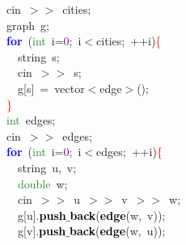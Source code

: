 {{\mbox{}\ \ \ \ cin\ \textcolor{BrickRed}{$>$$>$}\ cities\textcolor{BrickRed}{;} \\
\mbox{}\ \ \ \ graph\ g\textcolor{BrickRed}{;} \\
\mbox{}\ \ \ \ \textbf{\textcolor{Blue}{for}}\ \textcolor{BrickRed}{(}\textcolor{ForestGreen}{int}\ i\textcolor{BrickRed}{=}\textcolor{Purple}{0}\textcolor{BrickRed}{;}\ i\textcolor{BrickRed}{$<$}cities\textcolor{BrickRed}{;}\ \textcolor{BrickRed}{++}i\textcolor{BrickRed}{)}\textcolor{Red}{\{} \\
\mbox{}\ \ \ \ \ \ string\ s\textcolor{BrickRed}{;} \\
\mbox{}\ \ \ \ \ \ cin\ \textcolor{BrickRed}{$>$$>$}\ s\textcolor{BrickRed}{;} \\
\mbox{}\ \ \ \ \ \ g\textcolor{BrickRed}{[}s\textcolor{BrickRed}{]}\ \textcolor{BrickRed}{=}\ vector\textcolor{BrickRed}{$<$}edge\textcolor{BrickRed}{$>$();} \\
\mbox{}\ \ \ \ \textcolor{Red}{\}} \\
\mbox{}\ \ \ \ \textcolor{ForestGreen}{int}\ edges\textcolor{BrickRed}{;} \\
\mbox{}\ \ \ \ cin\ \textcolor{BrickRed}{$>$$>$}\ edges\textcolor{BrickRed}{;} \\
\mbox{}\ \ \ \ \textbf{\textcolor{Blue}{for}}\ \textcolor{BrickRed}{(}\textcolor{ForestGreen}{int}\ i\textcolor{BrickRed}{=}\textcolor{Purple}{0}\textcolor{BrickRed}{;}\ i\textcolor{BrickRed}{$<$}edges\textcolor{BrickRed}{;}\ \textcolor{BrickRed}{++}i\textcolor{BrickRed}{)}\textcolor{Red}{\{} \\
\mbox{}\ \ \ \ \ \ string\ u\textcolor{BrickRed}{,}\ v\textcolor{BrickRed}{;} \\
\mbox{}\ \ \ \ \ \ \textcolor{ForestGreen}{double}\ w\textcolor{BrickRed}{;} \\
\mbox{}\ \ \ \ \ \ cin\ \textcolor{BrickRed}{$>$$>$}\ u\ \textcolor{BrickRed}{$>$$>$}\ v\ \textcolor{BrickRed}{$>$$>$}\ w\textcolor{BrickRed}{;} \\
\mbox{}\ \ \ \ \ \ g\textcolor{BrickRed}{[}u\textcolor{BrickRed}{].}\textbf{\textcolor{Black}{push$\_$back}}\textcolor{BrickRed}{(}\textbf{\textcolor{Black}{edge}}\textcolor{BrickRed}{(}w\textcolor{BrickRed}{,}\ v\textcolor{BrickRed}{));} \\
\mbox{}\ \ \ \ \ \ g\textcolor{BrickRed}{[}v\textcolor{BrickRed}{].}\textbf{\textcolor{Black}{push$\_$back}}\textcolor{BrickRed}{(}\textbf{\textcolor{Black}{edge}}\textcolor{BrickRed}{(}w\textcolor{BrickRed}{,}\ u\textcolor{BrickRed}{));} \\
}}
